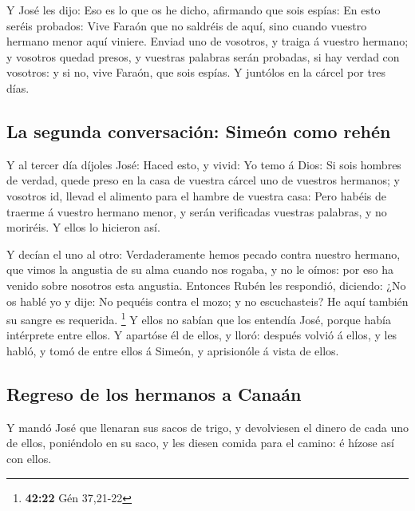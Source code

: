  Y José les dijo: Eso es lo que os he dicho, afirmando que
sois espías:  En esto seréis probados: Vive Faraón que no
saldréis de aquí, sino cuando vuestro hermano menor aquí viniere.
 Enviad uno de vosotros, y traiga á vuestro hermano; y
vosotros quedad presos, y vuestras palabras serán probadas, si hay
verdad con vosotros: y si no, vive Faraón, que sois espías.
 Y juntólos en la cárcel por tres días.

\hypertarget{la-segunda-conversaciuxf3n-simeuxf3n-como-rehuxe9n}{%
\subsection{La segunda conversación: Simeón como
rehén}\label{la-segunda-conversaciuxf3n-simeuxf3n-como-rehuxe9n}}

 Y al tercer día díjoles José: Haced esto, y vivid: Yo temo
á Dios:  Si sois hombres de verdad, quede preso en la casa
de vuestra cárcel uno de vuestros hermanos; y vosotros id, llevad el
alimento para el hambre de vuestra casa:  Pero habéis de
traerme á vuestro hermano menor, y serán verificadas vuestras palabras,
y no moriréis. Y ellos lo hicieron así.

 Y decían el uno al otro: Verdaderamente hemos pecado
contra nuestro hermano, que vimos la angustia de su alma cuando nos
rogaba, y no le oímos: por eso ha venido sobre nosotros esta angustia.
 Entonces Rubén les respondió, diciendo: ¿No os hablé yo y
dije: No pequéis contra el mozo; y no escuchasteis? He aquí también su
sangre es requerida. \footnote{\textbf{42:22} Gén 37,21-22}
 Y ellos no sabían que los entendía José, porque había
intérprete entre ellos.  Y apartóse él de ellos, y lloró:
después volvió á ellos, y les habló, y tomó de entre ellos á Simeón, y
aprisionóle á vista de ellos.

\hypertarget{regreso-de-los-hermanos-a-canauxe1n}{%
\subsection{Regreso de los hermanos a
Canaán}\label{regreso-de-los-hermanos-a-canauxe1n}}

 Y mandó José que llenaran sus sacos de trigo, y
devolviesen el dinero de cada uno de ellos, poniéndolo en su saco, y les
diesen comida para el camino: é hízose así con ellos.

